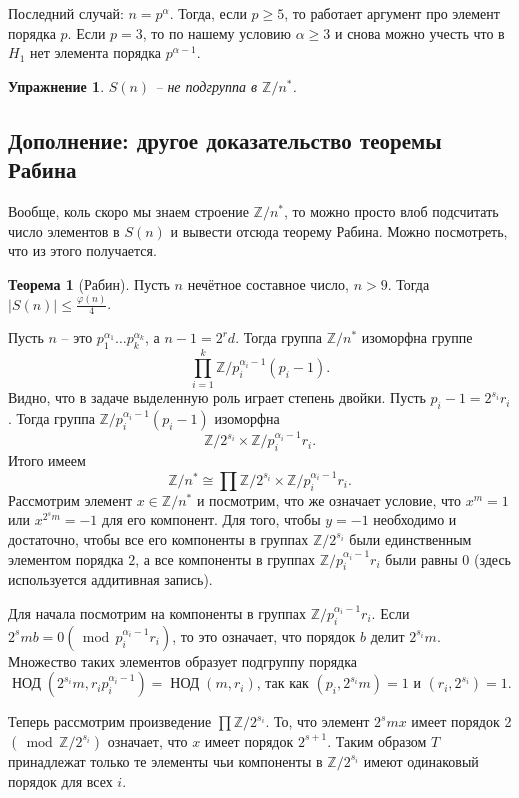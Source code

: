 \documentclass[10pt,a4paper,oneside]{book}
\newtheorem{uprz}{\color{violet!100!black} Упражнение}
\theoremstyle{definition}
\newtheorem*{thmm}{\color{red!40!black} Теорема}
\renewcommand{\leq}{\leqslant}
\renewcommand{\geq}{\geqslant}
\renewcommand{\mod}{\,\operatorname{mod}\,}
\newcommand{\mb}[1]{\mathbb{#1}}
\newcommand{\Nod}{\operatorname{\text{НОД}}}
\def\upr{\begin{uprz}}
\def\eupr{\end{uprz}}
\begin{document}
Последний случай: $n=p^{\alpha}$. Тогда, если $p\geq 5$, то работает аргумент про элемент порядка $p$. Если $p=3$, то по нашему условию $\alpha\geq 3$ и снова можно учесть что в $H_1$ нет элемента порядка $p^{\alpha-1}$.

\endproof


\upr $S(n)$ -- не подгруппа в $\mb Z/n^*$.
\eupr

\subsection{Дополнение: другое доказательство теоремы Рабина}

Вообще, коль скоро мы знаем строение $\mb Z/n^*$, то можно просто влоб подсчитать число элементов в $S(n)$ и вывести отсюда теорему Рабина. Можно посмотреть, что из этого получается.

\begin{thmm}[Рабин] Пусть $n$ нечётное составное число,  $n>9$. Тогда $|S(n)|\leq \frac{\varphi(n)}{4}$.
\end{thmm}
\proof Пусть $n$ -- это $p_1^{\alpha_1}\dots p_k^{\alpha_k}$, а $n-1=2^rd$. Тогда группа $\mb Z/n^*$ изоморфна группе
$$ \prod_{i=1}^k \mb Z/p_i^{\alpha_i-1}(p_i -1).$$
Видно, что в задаче выделенную роль играет степень двойки. Пусть $p_i-1=2^{s_i}r_i$. Тогда группа $\mb Z/p_i^{\alpha_i-1}(p_i -1)$ изоморфна 
$$\mb Z/2^{s_i}\times \mb Z/p_i^{\alpha_i-1}r_i.$$
Итого имеем 
$$\mb Z/n^*\cong \prod \mb Z/2^{s_i} \times \mb Z/p_i^{\alpha_i-1}r_i.$$ 
Рассмотрим элемент $x\in \mb Z/n^*$ и посмотрим, что же означает условие, что $x^m=1$ или $x^{2^sm}=-1$ для его компонент. 
Для того, чтобы $y=-1$ необходимо и достаточно, чтобы все его компоненты в группах $\mb Z/2^{s_i}$ были единственным элементом порядка $2$, а все компоненты в группах $\mb Z/p_i^{\alpha_i-1}r_i$ были равны 0 (здесь используется аддитивная запись).

Для начала посмотрим на компоненты в группах $\mb Z/p_i^{\alpha_i-1}r_i$. Если $2^smb=0 (\mod p_i^{\alpha_i-1}r_i)$, то это означает, что порядок $b$ делит $2^{s_i}m$. Множество таких элементов образует подгруппу порядка $\Nod(2^{s_i}m,r_ip_i^{\alpha_i-1})=\Nod(m,r_i)$, так как $(p_i,2^{s_i}m)=1$ и $(r_i,2^{s_i})=1$.

Теперь рассмотрим произведение $\prod \mb Z/2^{s_i}$. То, что элемент $2^{s}mx$ имеет порядок 2 $(\mod \mb Z/2^{s_i})$ означает, что $x$ имеет порядок $2^{s+1}$. Таким образом $T$ принадлежат только те элементы чьи компоненты в $\mb Z/2^{s_i}$ имеют одинаковый порядок для всех $i$.
\end{document}
